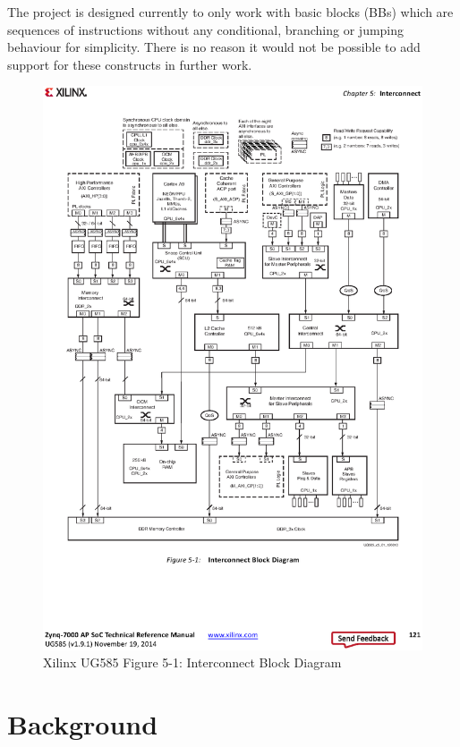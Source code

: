 \documentclass[a4paper]{article}
\begin{document}
The project is designed currently to only work with basic blocks (BBs) which are sequences of instructions without any conditional, branching or jumping behaviour for simplicity. There is no reason it would not be possible to add support for these constructs in further work.

\begin{figure}[p]
  \includegraphics[width=1.4\textwidth,center]{fig/interconnect-block.eps}
  \caption{Xilinx UG585 Figure 5-1: Interconnect Block Diagram}
  \label{fig:inter-block}
\end{figure}

\section{Background}
\end{document}
